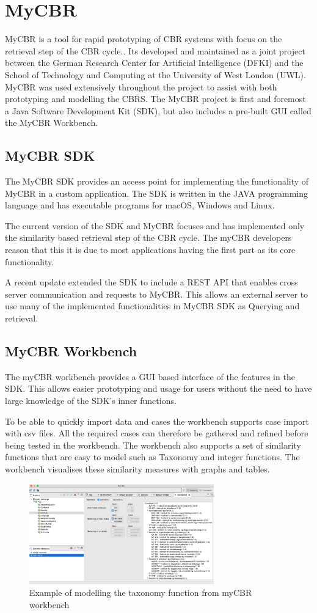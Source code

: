 \section{MyCBR}
MyCBR is a tool for rapid prototyping of CBR systems with focus on the retrieval step of the CBR cycle.\cite{MyCBR}. Its developed and maintained as a joint project between the German Research Center for Artificial Intelligence (DFKI) and the School of Technology and Computing at the University of West London (UWL)\cite{Stahl2008}. MyCBR was used extensively throughout the project to assist with both prototyping and modelling the CBRS. The MyCBR project is first and foremost a Java Software Development Kit (SDK), but also includes a pre-built GUI called the MyCBR Workbench. 

\subsection{MyCBR SDK}
The MyCBR SDK provides an access point for implementing the functionality of MyCBR in a custom application. The SDK is written in the JAVA programming language and has executable programs for macOS, Windows and Linux\cite{MyCBR}. 

The current version of the SDK and MyCBR focuses and has implemented only the similarity based retrieval step of the CBR cycle. The myCBR developers reason that this it is due to most applications having the first part as its core functionality\cite{Stahl2008}.  

A recent update extended the SDK to include a REST API that enables cross server communication and requests to MyCBR. This allows an external server to use many of the implemented functionalities in MyCBR SDK as Querying and retrieval.

\subsection{MyCBR Workbench}

The myCBR workbench provides a GUI based interface of the features in the SDK. This allows easier prototyping and usage for users without the need to have large knowledge of the SDK's inner functions\cite{bach2014knowledge}. 

To be able to quickly import data and cases the workbench supports case import with csv files. All the required cases can therefore be gathered and refined before being tested in the workbench. The workbench also supports a set of similarity functions that are easy to model such as Taxonomy and integer functions. The workbench visualises these similarity measures with graphs and tables.

\begin{figure}[H]
    \centering
    \includegraphics[width=8cm]{fig/myCBRworkbench.png}
    \caption{Example of modelling the taxonomy function from myCBR workbench}
\end{figure}






\cleardoublepage